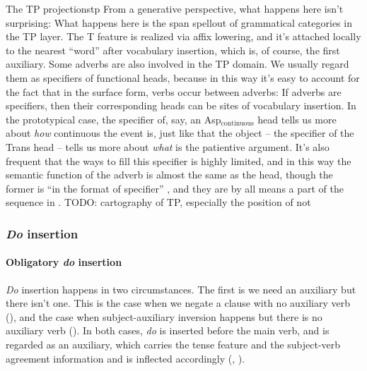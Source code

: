 \documentclass[UTF8, a4paper, oneside, scheme=plain]{ctexrep}
\newcommand{\corpus}[1]{\emph{#1}}
\begin{document}
\begin{theorybox}{The TP projections}{tp}
    From a generative perspective, 
    what happens here isn't surprising:
    What happens here is the span spellout of grammatical categories in the TP layer.
    The T feature is realized via affix lowering, 
    and it's attached locally to the nearest ``word'' after vocabulary insertion,
    which is, of course, the first auxiliary.
    Some adverbs are also involved in the TP domain.
    We usually regard them as specifiers of functional heads,
    because in this way it's easy to account for the fact that 
    in the surface form, verbs occur between adverbs:
    If adverbs are specifiers,
    then their corresponding heads can be sites of vocabulary insertion.
    In the prototypical case, 
    the specifier of, say, an Asp$_{\text{continuous}}$ head 
    tells us more about \emph{how} continuous the event is,
    just like that the object -- the specifier of the Trans head -- 
    tells us more about \emph{what} is the patientive argument.
    It's also frequent that the ways to fill this specifier is highly limited,
    and in this way the semantic function of the adverb 
    is almost the same as the head, though the former is ``in the format of specifier''
    \citep{shlonsky2010cartographic},
    and they are by all means a part of the sequence in .
    TODO: cartography of TP, especially the position of not
\end{theorybox}

\subsubsection{\corpus{Do} insertion}\label{sec:verb-inflection.do}

\paragraph{Obligatory \corpus{do} insertion}

\corpus{Do} insertion happens in two circumstances.
The first is we need an auxiliary but there isn't one.
This is the case when we negate a clause with no auxiliary verb
(),
and the case when subject-auxiliary inversion happens but there is no auxiliary verb
().
In both cases, \corpus{do} is inserted before the main verb,
and is regarded as an auxiliary,
which carries the tense feature and the subject-verb agreement information
and is inflected accordingly
(, ).
\end{document}
